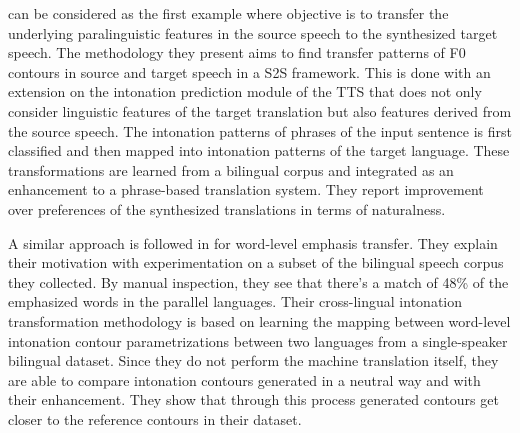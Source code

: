 \citep{aguero2006prosody} can be considered as the first example where objective is to transfer the underlying paralinguistic features in the source speech to the synthesized target speech. The methodology they present aims to find transfer patterns of F0 contours in source and target speech in a S2S framework. This is done with an extension on the intonation prediction module of the TTS that does not only consider linguistic features of the target translation but also features derived from the source speech. The intonation patterns of phrases of the input sentence is first classified and then mapped into intonation patterns of the target language. These transformations are learned from a bilingual corpus and integrated as an enhancement to a phrase-based translation system. They report improvement over preferences of the synthesized translations in terms of naturalness. 

A similar approach is followed in \cite{anumanchipalli:2012} for word-level emphasis transfer. They explain their motivation with experimentation on a subset of the bilingual speech corpus they collected. By manual inspection, they see that there's a match of 48\% of the emphasized words in the parallel languages. Their cross-lingual intonation transformation methodology is based on learning the mapping between word-level intonation contour parametrizations between two languages from a single-speaker bilingual dataset. Since they do not perform the machine translation itself, they are able to compare intonation contours generated in a neutral way and with their enhancement. They show that through this process generated contours get closer to the reference contours in their dataset.


